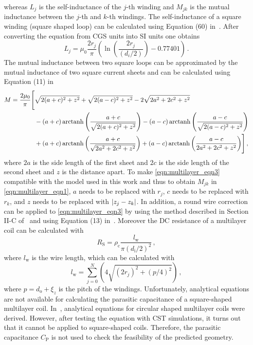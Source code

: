 whereas $L_j$ is the self-inductance of the $j$-th winding and $M_{jk}$ is the mutual inductance between the $j$-th and $k$-th windings. The self-inductance of a square winding (square shaped loop) can be calculated using Equation (60) in~\cite{grover2013}. After converting the equation from CGS units into SI units one obtains
\begin{equation}  \label{eqn:multilayer_eqn2}
	L_j = \mu_0\frac{2r_j}{\pi}\left(\ln\left(\frac{2r_j}{(d_i/2)}\right) - 0.77401\right)\,.
\end{equation}
The mutual inductance between two square loops can be approximated by the mutual inductance of two square current sheets and can be calculated using Equation (11) in~\cite{cheng}
\begin{equation} \label{eqn:multilayer_eqn3}
	\begin{aligned}
		M = \frac{2\mu_0}{\pi}\Bigg[&
		\sqrt{2(a+c)^2+z^2}+\sqrt{2(a-c)^2+z^2}-2\sqrt{2a^2+2c^2+z^2} \\ &-(a+c)\arctanh{\left(\frac{a+c}{\sqrt{2(a+c)^2+z^2}}\right)}-(a-c)\arctanh{\left(\frac{a-c}{\sqrt{2(a-c)^2+z^2}}\right)} \\
		&+(a+c)\arctanh{\left(\frac{a+c}{\sqrt{2a^2+2c^2+z^2}}\right)}+(a-c)\arctanh{\left(\frac{a-c}{2a^2+2c^2+z^2}\right)}\Bigg]\,,
	\end{aligned}
\end{equation}
where $2a$ is the side length of the first sheet and $2c$ is the side length of the second sheet and $z$ is the distance apart. To make \eqref{eqn:multilayer_eqn3} compatible with the model used in this work and thus to obtain $M_{jk}$ in \eqref{eqn:multilayer_eqn1}, $a$ needs to be replaced with $r_j$, $c$ needs to be replaced with $r_k$, and $z$ needs to be replaced with $\lvert z_j - z_k\rvert$. In addition, a round wire correction can be applied to \eqref{eqn:multilayer_eqn3} by using the method described in Section II-C of~\cite{cheng} and using Equation (13) in~\cite{cheng}. Moreover the DC resistance of a multilayer coil can be calculated with
\begin{equation} \label{eqn:multilayer_eqn4}
	R_\mathrm{S} = \rho_\mathrm{c}\frac{l_\mathrm{w}}{\pi(d_\mathrm{i}/2)^2}\,, 
\end{equation}
where $l_\mathrm{w}$ is the wire length, which can be calculated with
\begin{equation} \label{eqn:multilayer_eqn5}
	l_\mathrm{w} = \sum_{j=0}^{N}\left(4\sqrt{(2r_j)^2+(p/4)^2}\right)\,,
\end{equation}
where $p = d_\mathrm{o}+\xi_z$ is the pitch of the windings. Unfortunately, analytical equations are not available for calculating the parasitic capacitance of a square-shaped multilayer coil. In~\cite{6732932}, analytical equations for circular shaped multilayer coils were derived. However, after testing the equation with CST simulations, it turns out that it cannot be applied to square-shaped coils. Therefore, the parasitic capacitance $C_\mathrm{P}$ is not used to check the feasibility of the predicted geometry.

